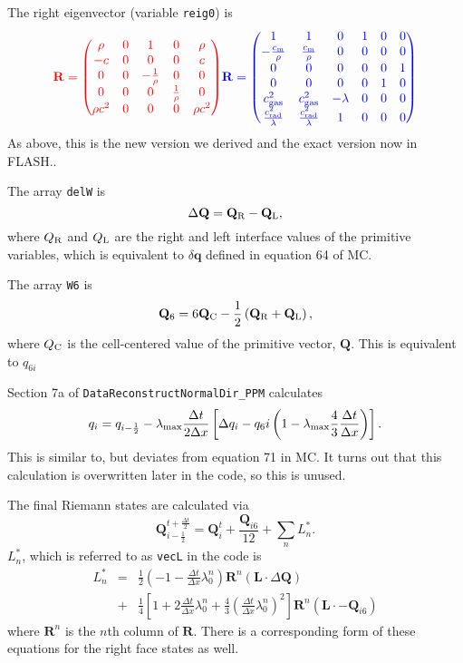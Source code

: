 \documentclass[preprint,11pt]{aastex}
\newcommand{\beq}{\begin{equation}}
\newcommand{\eeq}{\end{equation}}
\newcommand{\bea}{\begin{eqnarray}}
\newcommand{\eea}{\end{eqnarray}}
\begin{document}
The right eigenvector (variable \verb!reig0!) is
\beq
{\color{red}
\mathbf{R} = 
\begin{pmatrix}
\rho & 0 & 1 & 0 & \rho \\
-c & 0 & 0 & 0 & c \\
0 & 0 & -\frac{1}{\rho} & 0 & 0 \\
0 & 0 & 0 & \frac{1}{\rho} & 0 \\
\rho c^2 & 0 & 0 & 0 & \rho c^2
\end{pmatrix}
}
{\color{blue}
\mathbf{R} = 
\begin{pmatrix}
1 & 1 & 0 & 1 & 0 & 0 \\
- \frac{c_{\rm m}}{\rho} & \frac{c_{\rm m}}{\rho} & 0 & 0 & 0 & 0 \\
0 & 0 & 0 & 0 & 0 & 1\\
0 & 0 & 0 & 0 & 1 & 0\\
c_{\rm gas}^2 & c_{\rm gas}^2 & - \lambda & 0 & 0 & 0 \\
\frac{c_{\rm rad}^2}{\lambda} & \frac{c_{\rm rad}^2}{\lambda} & 1 & 0 & 0 & 0
\end{pmatrix}
}
\eeq
{\color{blue} As above, this is the new version we derived and the exact version now in FLASH.}.

The array \verb!delW! is
\beq
\Delta \mathbf{Q} = \mathbf{Q}_{\rm R} - \mathbf{Q}_{\rm L},
\eeq
where $Q_{\rm R}$ and $Q_{\rm L}$ are the right and left interface values of the primitive variables, which is equivalent to $\delta \mathbf{q}$ defined in equation 64 of MC.

The array \verb!W6! is
\beq
\mathbf{Q}_6 = 6 \mathbf{Q}_{\rm C} - \frac{1}{2} \left( \mathbf{Q}_{\rm R} + \mathbf{Q}_{\rm L} \right),
\eeq
where $Q_{\rm C}$ is the cell-centered value of the primitive vector, $\mathbf{Q}$.  This is equivalent to $q_{6i}$

Section 7a of \verb!DataReconstructNormalDir_PPM! calculates
\beq
q_i = q_{i-\frac{1}{2}} - \lambda_{\rm max} \frac{\Delta t}{2 \Delta x} \left[ \Delta q_i - q_6i \left( 1 - \lambda_{\rm max} \frac{4}{3} \frac{\Delta t}{\Delta x}  \right) \right].
\eeq
This is similar to, but deviates from equation 71 in MC.  It turns out that this calculation is overwritten later in the code, so this is unused.

The final Riemann states are calculated via 
\beq
\label{rstates}
\mathbf{Q}_{i-\frac{1}{2}}^{t+\frac{\Delta t}{2}} = \mathbf{Q}_{i}^{t} + \frac{\mathbf{Q}_{i6}}{12} + \sum\limits_n L^*_n.
\eeq
$L^*_n$, which is referred to as \verb!vecL! in the code is
\bea
L^*_n &=& \frac{1}{2} \left( -1 - \frac{\Delta t}{\Delta x} \lambda_{0}^n \right) \mathbf{R}^n \left( \mathbf{L} \cdot \Delta \mathbf{Q} \right) \nonumber \\
&+& \frac{1}{4} \left[ 1 + 2 \frac{\Delta t}{\Delta x} \lambda_{0}^n  + \frac{4}{3} \left( \frac{\Delta t}{\Delta x} \lambda_0^n \right)^2 \right] \mathbf{R}^n \left( \mathbf{L} \cdot - \mathbf{Q}_{i6} \right)
\eea
where $\mathbf{R}^n$ is the $n$th column of $\mathbf{R}$.  There is a corresponding form of these equations for the right face states as well.
\end{document}

